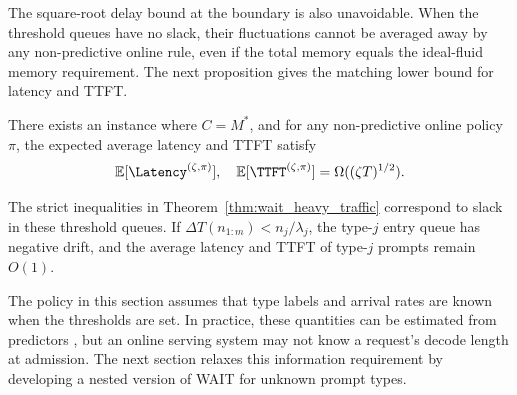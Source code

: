 The square-root delay bound at the boundary is also unavoidable. When the threshold queues have no slack, their fluctuations cannot be averaged away by any non-predictive online rule, even if the total memory equals the ideal-fluid memory requirement. The next proposition gives the matching lower bound for latency and TTFT.
\begin{proposition}\label{prop::simple random walk, tight bound}
There exists an instance where \( C = M^* \), and for any non-predictive online policy \(\pi\), the expected average latency and TTFT satisfy
\[
\mathbb{E}[\Latency^{(\zeta,\pi)}],\quad \mathbb{E}[\TTFT^{(\zeta,\pi)}] = \Omega((\zeta T)^{1/2}).
\]
\end{proposition}
The strict inequalities in Theorem~\ref{thm:wait_heavy_traffic} correspond to slack in these threshold queues. If \(\Delta T(n_{1:m})<n_j/\lambda_j\), the type-\(j\) entry queue has negative drift, and the average latency and TTFT of type-\(j\) prompts remain \(O(1)\).

The policy in this section assumes that type labels and arrival rates are known when the thresholds are set. In practice, these quantities can be estimated from predictors \citep{fu2025efficient}, but an online serving system may not know a request's decode length at admission. The next section relaxes this information requirement by developing a nested version of WAIT for unknown prompt types.

